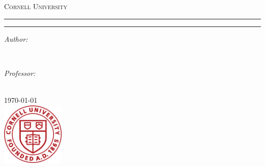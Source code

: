 \begin{titlepage}
  \newcommand{\HRule}{\rule{\linewidth}{0.5mm}}

  \center

  \textsc{\LARGE Cornell University}
  \vspace{1.0cm}
  
  \textsc{\Large \CouseCode} \vspace{0.5cm}
  \textsc{\large \CouseName} \vspace{0.5cm}

  \HRule \vspace{0.40cm}
  { \huge \bfseries \Title} \vspace{0.40cm}
  \HRule \vspace{1.5cm}

  \begin{minipage}{0.45\textwidth}
  \begin{flushleft} \large
  \emph{Author:}\\ \CoverAuthor
  \end{flushleft}
  \end{minipage}
  ~
  \begin{minipage}{0.45\textwidth}
  \begin{flushright} \large
  \emph{Professor:} \\
  \ProfessorName
  \end{flushright}
  \end{minipage}\\[4cm]

  {\large \today}\\[3cm]

  \includegraphics[width=3cm]{images/cu.png}\\[1cm]
   
  \vfill

\end{titlepage}
